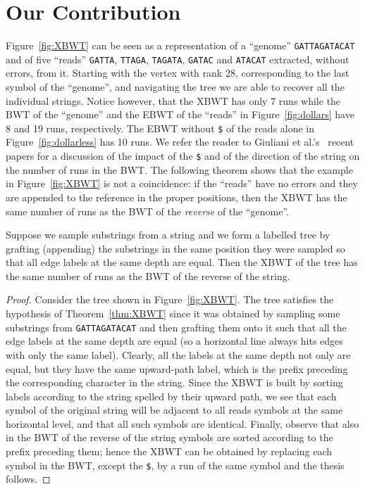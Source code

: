 \section{Our Contribution} \label{xbwt:sec:main}

{Figure~\ref{fig:XBWT} can be seen as a representation of a ``genome''  {\tt GATTAGATACAT} and of five ``reads'' {\tt GATTA}, {\tt TTAGA}, {\tt TAGATA}, {\tt GATAC} and {\tt ATACAT} extracted, without errors, from it. Starting with the vertex with rank 28, corresponding to the last symbol of the ``genome'', and navigating the tree we are able to recover all the individual strings.  Notice however, that the XBWT has only 7 runs while the BWT of the ``genome'' and the EBWT of the ``reads'' in Figure~\ref{fig:dollars} have 8 and 19 runs, respectively. The EBWT without {\tt \$} of the reads alone in Figure~\ref{fig:dollarless} has 10 runs. We refer the reader to Giuliani et al.'s~\cite{10.1007/978-3-030-67731-2_18,giuliani2019dollar} recent papers for a discussion of the impact of the {\tt \$} and of the direction of the string on the number of runs in the BWT. The following theorem shows that the example in  Figure~\ref{fig:XBWT} is not a coincidence: if the ``reads'' have no errors and they are appended to the reference in the proper positions, then the XBWT has the same number of runs as the BWT of the {\it reverse} of the ``genome''.} 




\begin{theorem}\label{thm:XBWT}
Suppose we sample substrings from a string and we form a labelled tree by grafting (appending) the substrings in the same position they were sampled so that all edge labels at the same depth are equal. Then the XBWT of the tree has the same number of runs as the BWT of the reverse of the string.
\end{theorem}

\begin{proof} 
Consider the tree shown in Figure~\ref{fig:XBWT}.  The tree satisfies the hypothesis of Theorem~\ref{thm:XBWT} since it was obtained by sampling some substrings from {\tt GATTAGATACAT} and then grafting them onto it such that all the edge labels at the same depth are equal  (so a horizontal line always hits edges with only the same label). Clearly, all the labels at the same depth not only are equal, but they have the same upward-path label, which is the prefix preceding the corresponding character in the string. {Since the XBWT is built by sorting labels according to the string spelled by their upward path, we see that each symbol of the original string will be adjacent to all reads symbols at the same horizontal level, and that all such symbols are identical. Finally, observe that also in the BWT of the reverse of the string symbols are sorted according to the prefix preceding them; hence the XBWT can be obtained by replacing each symbol in the BWT, except the {\tt \$}, by a run of the same symbol and the thesis follows.}
\end{proof}


